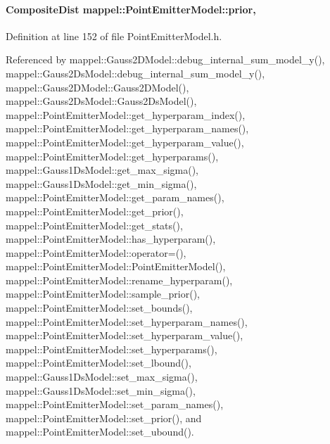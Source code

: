 \paragraph[{\texorpdfstring{prior}{prior}}]{\setlength{\rightskip}{0pt plus 5cm}Composite\+Dist mappel\+::\+Point\+Emitter\+Model\+::prior\hspace{0.3cm}{\ttfamily [protected]}, {\ttfamily [inherited]}}\hypertarget{classmappel_1_1PointEmitterModel_a393839f8eb1dd3d61c9369377742ba0e}{}\label{classmappel_1_1PointEmitterModel_a393839f8eb1dd3d61c9369377742ba0e}


Definition at line 152 of file Point\+Emitter\+Model.\+h.



Referenced by mappel\+::\+Gauss2\+D\+Model\+::debug\+\_\+internal\+\_\+sum\+\_\+model\+\_\+y(), mappel\+::\+Gauss2\+Ds\+Model\+::debug\+\_\+internal\+\_\+sum\+\_\+model\+\_\+y(), mappel\+::\+Gauss2\+D\+Model\+::\+Gauss2\+D\+Model(), mappel\+::\+Gauss2\+Ds\+Model\+::\+Gauss2\+Ds\+Model(), mappel\+::\+Point\+Emitter\+Model\+::get\+\_\+hyperparam\+\_\+index(), mappel\+::\+Point\+Emitter\+Model\+::get\+\_\+hyperparam\+\_\+names(), mappel\+::\+Point\+Emitter\+Model\+::get\+\_\+hyperparam\+\_\+value(), mappel\+::\+Point\+Emitter\+Model\+::get\+\_\+hyperparams(), mappel\+::\+Gauss1\+Ds\+Model\+::get\+\_\+max\+\_\+sigma(), mappel\+::\+Gauss1\+Ds\+Model\+::get\+\_\+min\+\_\+sigma(), mappel\+::\+Point\+Emitter\+Model\+::get\+\_\+param\+\_\+names(), mappel\+::\+Point\+Emitter\+Model\+::get\+\_\+prior(), mappel\+::\+Point\+Emitter\+Model\+::get\+\_\+stats(), mappel\+::\+Point\+Emitter\+Model\+::has\+\_\+hyperparam(), mappel\+::\+Point\+Emitter\+Model\+::operator=(), mappel\+::\+Point\+Emitter\+Model\+::\+Point\+Emitter\+Model(), mappel\+::\+Point\+Emitter\+Model\+::rename\+\_\+hyperparam(), mappel\+::\+Point\+Emitter\+Model\+::sample\+\_\+prior(), mappel\+::\+Point\+Emitter\+Model\+::set\+\_\+bounds(), mappel\+::\+Point\+Emitter\+Model\+::set\+\_\+hyperparam\+\_\+names(), mappel\+::\+Point\+Emitter\+Model\+::set\+\_\+hyperparam\+\_\+value(), mappel\+::\+Point\+Emitter\+Model\+::set\+\_\+hyperparams(), mappel\+::\+Point\+Emitter\+Model\+::set\+\_\+lbound(), mappel\+::\+Gauss1\+Ds\+Model\+::set\+\_\+max\+\_\+sigma(), mappel\+::\+Gauss1\+Ds\+Model\+::set\+\_\+min\+\_\+sigma(), mappel\+::\+Point\+Emitter\+Model\+::set\+\_\+param\+\_\+names(), mappel\+::\+Point\+Emitter\+Model\+::set\+\_\+prior(), and mappel\+::\+Point\+Emitter\+Model\+::set\+\_\+ubound().

